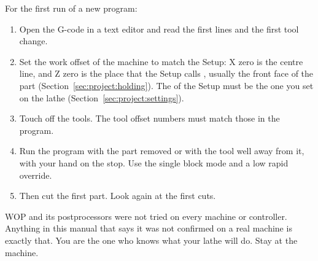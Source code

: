 For the first run of a new program:
\begin{enumerate}
  \item Open the G-code in a text editor and read the first lines and the first tool change.
  \item Set the work offset of the machine to match the Setup: X zero is the centre line, and Z zero is the place that the Setup calls , usually the front face of the part (Section~\ref{sec:project:holding}). The  of the Setup must be the one you set on the lathe (Section~\ref{sec:project:settings}).
  \item Touch off the tools. The tool offset numbers must match those in the program.
  \item Run the program with the part removed or with the tool well away from it, with your hand on the stop. Use the single block mode and a low rapid override.
  \item Then cut the first part. Look again at the first cuts.
\end{enumerate}

\begin{warningbox}
WOP and its postprocessors were not tried on every machine or controller. Anything in this manual that says it was not confirmed on a real machine is exactly that. You are the one who knows what your lathe will do. Stay at the machine.
\end{warningbox}
